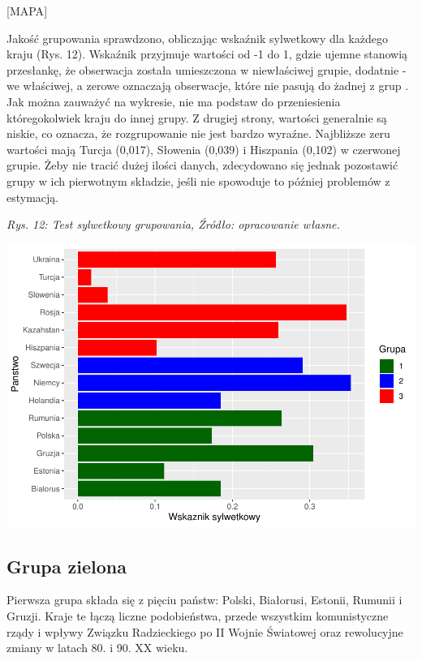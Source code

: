 \documentclass[12pt]{article}
\begin{document}
{[}MAPA{]}

Jakość grupowania sprawdzono, obliczając wskaźnik sylwetkowy dla każdego kraju (Rys. 12). Wskaźnik przyjmuje wartości od -1 do 1, gdzie ujemne stanowią przesłankę, że obserwacja została umieszczona w niewłaściwej grupie, dodatnie - we właściwej, a zerowe oznaczają obserwacje, które nie pasują do żadnej z grup \citep{Rousseeuw}. Jak można zauważyć na wykresie, nie ma podstaw do przeniesienia któregokolwiek kraju do innej grupy. Z drugiej strony, wartości generalnie są niskie, co oznacza, że rozgrupowanie nie jest bardzo wyraźne. Najbliższe zeru wartości mają Turcja (0,017), Słowenia (0,039) i Hiszpania (0,102) w czerwonej grupie. Żeby nie tracić dużej ilości danych, zdecydowano się jednak pozostawić grupy w ich pierwotnym składzie, jeśli nie spowoduje to później problemów z estymacją.

\emph{Rys. 12: Test sylwetkowy grupowania, Źródło: opracowanie własne.}

\begin{center}\includegraphics{text_ASA_files/figure-latex/silhouette-1} \end{center}

\hypertarget{grupa-zielona}{%
\subsection{Grupa zielona}\label{grupa-zielona}}

Pierwsza grupa składa się z pięciu państw: Polski, Białorusi, Estonii, Rumunii i Gruzji. Kraje te łączą liczne podobieństwa, przede wszystkim komunistyczne rządy i wpływy Związku Radzieckiego po II Wojnie Światowej oraz rewolucyjne zmiany w latach 80. i 90. XX wieku.
\end{document}

